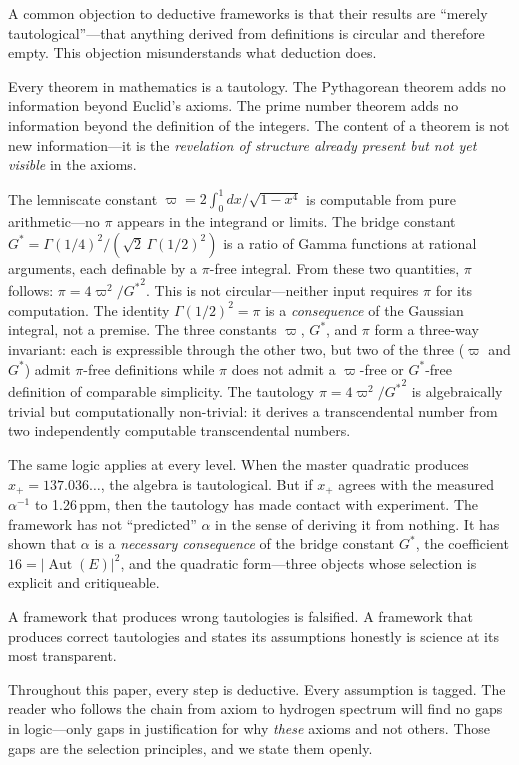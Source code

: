 \documentclass[12pt]{article}
\DeclareMathOperator{\Aut}{Aut}
\theoremstyle{compact}
\begin{document}
A common objection to deductive frameworks is that their results are ``merely tautological''---that anything derived from definitions is circular and therefore empty. This objection misunderstands what deduction does.

Every theorem in mathematics is a tautology. The Pythagorean theorem adds no information beyond Euclid's axioms. The prime number theorem adds no information beyond the definition of the integers. The content of a theorem is not new information---it is the \emph{revelation of structure already present but not yet visible} in the axioms.

The lemniscate constant $\varpi = 2\!\int_0^1 dx/\sqrt{1-x^4}$ is computable from pure arithmetic---no $\pi$ appears in the integrand or limits. The bridge constant ${G^{*}} = \Gamma(1/4)^2/(\sqrt{2}\,\Gamma(1/2)^2)$ is a ratio of Gamma functions at rational arguments, each definable by a $\pi$-free integral. From these two quantities, $\pi$ follows: $\pi = 4\varpi^2/{G^{*}}^2$. This is not circular---neither input requires $\pi$ for its computation. The identity $\Gamma(1/2)^2 = \pi$ is a \emph{consequence} of the Gaussian integral, not a premise. The three constants $\varpi$, ${G^{*}}$, and $\pi$ form a three-way invariant: each is expressible through the other two, but two of the three ($\varpi$ and ${G^{*}}$) admit $\pi$-free definitions while $\pi$ does not admit a $\varpi$-free or ${G^{*}}$-free definition of comparable simplicity. The tautology $\pi = 4\varpi^2/{G^{*}}^2$ is algebraically trivial but computationally non-trivial: it derives a transcendental number from two independently computable transcendental numbers.

The same logic applies at every level. When the master quadratic produces $x_+ = 137.036\ldots$, the algebra is tautological. But if $x_+$ agrees with the measured $\alpha^{-1}$ to 1.26\,ppm, then the tautology has made contact with experiment. The framework has not ``predicted'' $\alpha$ in the sense of deriving it from nothing. It has shown that $\alpha$ is a \emph{necessary consequence} of the bridge constant ${G^{*}}$, the coefficient $16 = |\Aut(E)|^2$, and the quadratic form---three objects whose selection is explicit and critiqueable.

A framework that produces wrong tautologies is falsified. A framework that produces correct tautologies and states its assumptions honestly is science at its most transparent.

Throughout this paper, every step is deductive. Every assumption is tagged. The reader who follows the chain from axiom to hydrogen spectrum will find no gaps in logic---only gaps in justification for why \emph{these} axioms and not others. Those gaps are the selection principles, and we state them openly.
\end{document}
